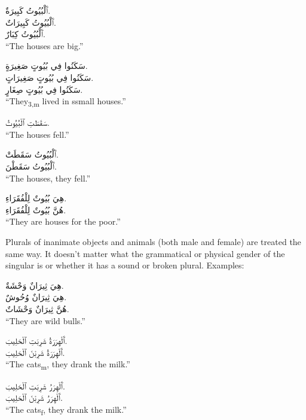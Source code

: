 \documentclass[
  10pt,
]{book}
\begin{document}
\foreignlanguage{arabic}{ٱَلْبُيُوتُ کَبِيرَةٌ.}\\
\foreignlanguage{arabic}{ٱَلْبُيُوتُ کَبِيرَاتٌ.}\\
\foreignlanguage{arabic}{ٱَلْبُيُوتُ کِبَارٌ.}\\
\enquote{The houses are big.}

\foreignlanguage{arabic}{سَکَنُوا فِي بُيُوتٍ صَغِيرَةٍ.}\\
\foreignlanguage{arabic}{سَکَنُوا فِي بُيُوتٍ صَغِيرَاتٍ.}\\
\foreignlanguage{arabic}{سَکَنُوا فِي بُيُوتٍ صِغَارٍ.}\\
\enquote{They\textsubscript{3,m} lived in ssmall houses.}

\foreignlanguage{arabic}{سَقَطَتِ ٱلْبُيُوتُ.}\\
\enquote{The houses fell.}

\foreignlanguage{arabic}{ٱَلْبُيُوتُ سَقَطَتْ.}\\
\foreignlanguage{arabic}{ٱَلْبُيُوتُ سَقَطْنَ.}\\
\enquote{The houses, they fell.}

\foreignlanguage{arabic}{هِيَ بُيُوتٌ لِلْفُقَرَاءِ.}\\
\foreignlanguage{arabic}{هُنَّ بُيُوتٌ لِلْفُقَرَاءِ.}\\
\enquote{They are houses for the poor.}

Plurals of inanimate objects and animals (both male and female) are treated the same way. It doesn't matter what the grammatical or physical gender of the singular is or whether it has a sound or broken plural. Examples:

\foreignlanguage{arabic}{هِيَ ثِيرَانٌ وَحْشَةٌ.}\\
\foreignlanguage{arabic}{هِيَ ثِيرَانٌ وُحُوشٌ.}\\
\foreignlanguage{arabic}{هُنَّ ثِيرَانٌ وَحْشَاتٌ.}\\
\enquote{They are wild bulls.}

\foreignlanguage{arabic}{ٱَلْهِرَرَةُ شَرِبَتِ ٱلْحَلِيبَ.}\\
\foreignlanguage{arabic}{ٱَلْهِرَرَةُ شَرِبْنَ ٱلْحَلِيبَ.}\\
\enquote{The cats\textsubscript{m}, they drank the milk.}

\foreignlanguage{arabic}{ٱَلْهِرَرُ شَرِبَتِ ٱلْحَلِيبَ.}\\
\foreignlanguage{arabic}{ٱَلْهِرَرُ شَرِبْنَ ٱلْحَلِيبَ.}\\
\enquote{The cats\textsubscript{f}, they drank the milk.}
\end{document}
